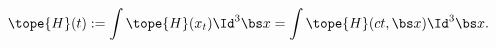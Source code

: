 \begin{equation}	\label{12.75}
\tope{H}(t)
:=
\int \tope{H}(x_t) \Id^3\bs x
=
\int \tope{H}(ct,\bs x) \Id^3\bs x .
	\end{equation}


